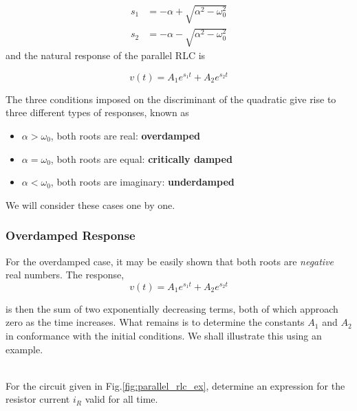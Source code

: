 \documentclass[11pt]{article}
\numberwithin{equation}{section}
\begin{document}
\begin{flushleft}
\begin{align}
s_1 &= -\alpha + \sqrt{\alpha^2 - \omega_0^2}\\
s_2 &= -\alpha - \sqrt{\alpha^2 - \omega_0^2}
\end{align}
and the natural response of the parallel RLC is

\begin{equation}
v(t) = A_1e^{s_1t} + A_2e^{s_2t}
\end{equation}

The three conditions imposed on the discriminant of the quadratic give rise to three different types of responses, known as

\begin{itemize}
\item $\alpha > \omega_0$, both roots are real: \textbf{overdamped}
\item $\alpha = \omega_0$, both roots are equal: \textbf{critically damped}
\item $\alpha < \omega_0$, both roots are imaginary: \textbf{underdamped}
\end{itemize}

We will consider these cases one by one.

\color{blue}
\subsubsection{Overdamped Response}
\color{black}

For the overdamped case, it may be easily shown that both roots are \textit{negative} real numbers. The response,
\begin{equation*}
v(t) = A_1e^{s_1t} + A_2e^{s_2t}
\end{equation*}

is then the sum of two exponentially decreasing terms, both of which approach zero as the time increases. What remains is to determine the constants
$A_1$ and $A_2$ in conformance with the initial conditions. We shall illustrate this using an example. \\~\\

\begin{tcolorbox}[colback=Magenta!5, colframe=Magenta!75!black, title=\textbf{Example 3.1}, breakable]

For the circuit given in Fig.\ref{fig:parallel_rlc_ex}, determine an expression for the resistor current $i_R$ valid for all time.


\end{tcolorbox}
\end{flushleft}
\end{document}
